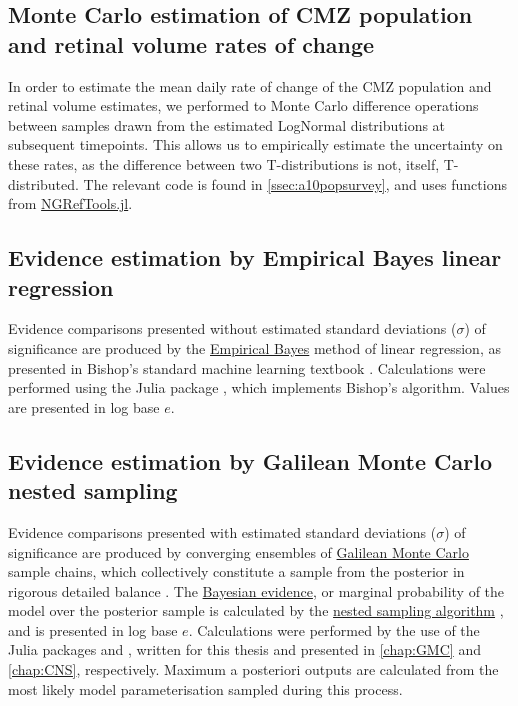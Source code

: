 \subsection{Monte Carlo estimation of CMZ population and retinal volume rates of change}
\label{ssec:MCrates}
In order to estimate the mean daily rate of change of the CMZ population and retinal volume estimates, we performed to Monte Carlo difference operations between samples drawn from the estimated LogNormal distributions at subsequent timepoints. This allows us to empirically estimate the uncertainty on these rates, as the difference between two T-distributions is not, itself, T-distributed. The relevant code is found in \autoref{ssec:a10popsurvey}, and uses functions from \hyperref[NGRefTools]{NGRefTools.jl}.


\subsection{Evidence estimation by Empirical Bayes linear regression}
\label{ssec:CMZEmpBayes}
Evidence comparisons presented without estimated standard deviations ($\sigma$) of significance are produced by the \hyperref[ssec:EmpiricalBayes]{Empirical Bayes} method of linear regression, as presented in Bishop's standard machine learning textbook \cite{Bishop2006}. Calculations were performed using the Julia package , which implements Bishop's algorithm. Values are presented in log base $e$.

\subsection{Evidence estimation by Galilean Monte Carlo nested sampling}
\label{ssec:GMCev}

Evidence comparisons presented with estimated standard deviations ($\sigma$) of significance are produced by converging ensembles of \hyperref[ssec:GMC]{Galilean Monte Carlo} sample chains, which collectively constitute a sample from the posterior in rigorous detailed balance \cite{Skilling2019}. The \hyperref[ssec:BayesEpistemology]{Bayesian evidence}, or marginal probability of the model over the posterior sample is calculated by the \hyperref[ssec:nested]{nested sampling algorithm} \cite{Skilling2006}, and is presented in log base $e$. Calculations were performed by the use of the Julia packages  and , written for this thesis and presented in \autoref{chap:GMC} and \autoref{chap:CNS}, respectively. Maximum a posteriori outputs are calculated from the most likely model parameterisation sampled during this process.

